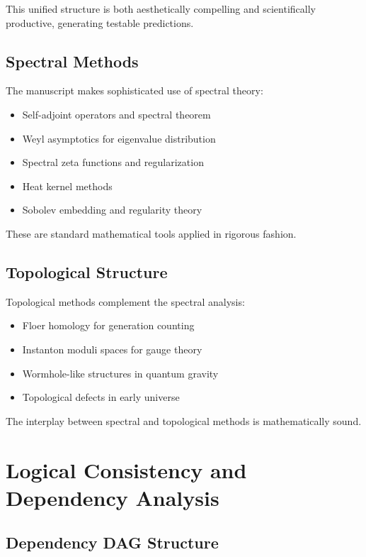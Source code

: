 \documentclass[11pt,a4paper]{article}
\theoremstyle{definition}
\begin{document}
This unified structure is both aesthetically compelling and scientifically productive, generating testable predictions.

\subsection{Spectral Methods}

The manuscript makes sophisticated use of spectral theory:

\begin{itemize}
    \item Self-adjoint operators and spectral theorem
    \item Weyl asymptotics for eigenvalue distribution
    \item Spectral zeta functions and regularization
    \item Heat kernel methods
    \item Sobolev embedding and regularity theory
\end{itemize}

These are standard mathematical tools applied in rigorous fashion.

\subsection{Topological Structure}

Topological methods complement the spectral analysis:

\begin{itemize}
    \item Floer homology for generation counting
    \item Instanton moduli spaces for gauge theory
    \item Wormhole-like structures in quantum gravity
    \item Topological defects in early universe
\end{itemize}

The interplay between spectral and topological methods is mathematically sound.

\section{Logical Consistency and Dependency Analysis}

\subsection{Dependency DAG Structure}
\end{document}

